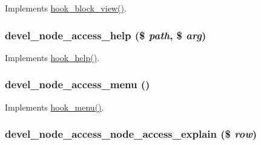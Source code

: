 \label{devel__node__access_8module_a0394c90f9987f4c074827f8bb366e3d0}
Implements \hyperlink{group__hooks_gaa14092a3e74cdc57aa295100cfd6860d}{hook\_\-block\_\-view()}. \hypertarget{devel__node__access_8module_afbc807b6e8d3f6a358d446096b66d7c6}{
\subsubsection[{devel\_\-node\_\-access\_\-help}]{\setlength{\rightskip}{0pt plus 5cm}devel\_\-node\_\-access\_\-help (\$ {\em path}, \/  \$ {\em arg})}}
\label{devel__node__access_8module_afbc807b6e8d3f6a358d446096b66d7c6}
Implements \hyperlink{group__hooks_ga5589c2714a782738e8851c4c90231f0e}{hook\_\-help()}. \hypertarget{devel__node__access_8module_ac40f3cbfd11533898c8c6b9b5dd4eae5}{
\subsubsection[{devel\_\-node\_\-access\_\-menu}]{\setlength{\rightskip}{0pt plus 5cm}devel\_\-node\_\-access\_\-menu ()}}
\label{devel__node__access_8module_ac40f3cbfd11533898c8c6b9b5dd4eae5}
Implements \hyperlink{group__hooks_ga5c95244fea59b25666e409759e133ded}{hook\_\-menu()}. \hypertarget{devel__node__access_8module_a7b594d5b01b220abc354695853569809}{
\subsubsection[{devel\_\-node\_\-access\_\-node\_\-access\_\-explain}]{\setlength{\rightskip}{0pt plus 5cm}devel\_\-node\_\-access\_\-node\_\-access\_\-explain (\$ {\em row})}}
\label{devel__node__access_8module_a7b594d5b01b220abc354695853569809}
